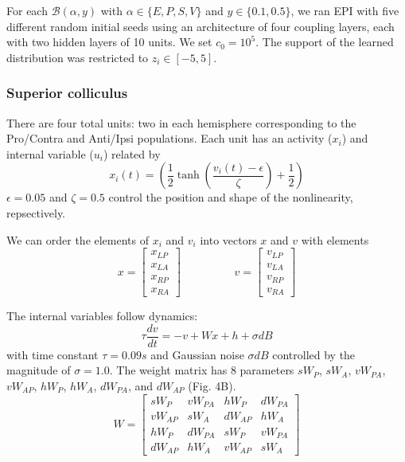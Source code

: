 \documentclass[11pt]{article}
\begin{document}
For each $\mathcal{B}(\alpha, y)$ with $\alpha \in \{E, P, S, V\}$ and $y \in \{0.1, 0.5\}$, we ran EPI with five different random initial seeds using an architecture of four coupling layers, each with two hidden layers of 10 units.  We set $c_0 = 10^5$.  The support of the learned distribution was restricted to $z_i \in \left[-5, 5\right]$.


\subsubsection{Superior colliculus}\label{methods_SC}
There are four total units: two in each hemisphere corresponding to the Pro/Contra and Anti/Ipsi populations.  Each unit has an activity ($x_i$) and internal variable ($u_i$) related by
\begin{equation}
x_i(t) =\left(\frac{1}{2}\tanh\left(\frac{v_i(t) - \epsilon}{\zeta}\right)+ \frac{1}{2} \right)
\end{equation}
$\epsilon = 0.05$ and $\zeta = 0.5$ control the position and shape of the nonlinearity, repsectively.

We can order the elements of $x_i$ and $v_i$ into vectors $x$ and $v$ with elements
\begin{equation}
x = \begin{bmatrix} x_{LP} \\ x_{LA} \\ x_{RP} \\ x_{RA} \end{bmatrix} \hspace{2cm} v = \begin{bmatrix} v_{LP} \\ v_{LA} \\ v_{RP} \\ v_{RA} \end{bmatrix}
\end{equation}

 The internal variables follow dynamics:
\begin{equation}
\tau \frac{dv}{dt} = -v + Wx + h + \sigma dB
\end{equation}
with time constant $\tau = 0.09s$ and Gaussian noise $\sigma dB$ controlled by the magnitude of $\sigma=1.0$.  The weight matrix has 8 parameters $sW_P$, $sW_A$, $vW_{PA}$, $vW_{AP}$, $hW_P$, $hW_A$, $dW_{PA}$, and $dW_{AP}$ (Fig. 4B).
\begin{equation}
W = \begin{bmatrix} sW_P & vW_{PA} & hW_P & dW_{PA}  \\ vW_{AP}  & sW_A & dW_{AP}  & hW_A \\ hW_P & dW_{PA}  & sW_P & vW_{PA}  \\ dW_{AP}  & hW_A & vW_{AP}  & sW_A \end{bmatrix}
\end{equation}
\end{document}
